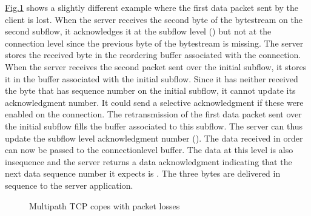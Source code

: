 \documentclass[letterpaper,10pt,english]{sphinxmanual}
\begin{document}
\sphinxAtStartPar
\hyperref[\detokenize{mptcp:fig-mptcp-dss-concept2}]{Fig.\@ \ref{\detokenize{mptcp:fig-mptcp-dss-concept2}}} shows a slightly different example where the first data packet sent by the client is lost. When the server receives the second byte of the bytestream on the second subflow, it acknowledges it at the subflow level () but not at the connection level since the previous byte of the bytestream is missing. The server stores the received byte in the reordering buffer associated with the connection. When the server receives the second packet sent over the initial subflow, it stores it in the buffer associated with the initial subflow. Since it has neither received the byte that has sequence number  on the initial subflow, it cannot update its acknowledgment number. It could send a selective acknowledgment if these were enabled on the connection. The retransmission of the first data packet sent over the initial subflow fills the buffer associated to this subflow. The server can thus update the subflow level acknowledgment number (). The data received in order can now be passed to the connection\sphinxhyphen{}level buffer. The data at this level is also in\sphinxhyphen{}sequence and the server returns a data acknowledgment indicating that the next data sequence number it expects is . The three bytes  are delivered in sequence to the server application.
\begin{figure}[htbp]\centering\capstart{}\caption{Multipath TCP copes with packet losses}\label{\detokenize{mptcp:id70}}\label{\detokenize{mptcp:fig-mptcp-dss-concept2}}\end{figure}
\end{document}
